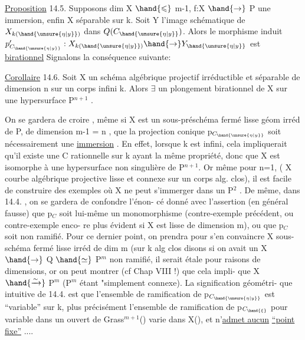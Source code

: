 
\uline{Proposition} 14.5. Supposons dim X $\hand{\leqslant}$ m-1, 
 f:X $\hand{\to}$ P une immersion,  enfin X séparable sur k. Soit Y l'image
schématique de $X_{k(\hand{\unsure{\eta|y}})}$ dans $Q(C_{\hand{\unsure{\eta|y}}})$. Alors le morphisme induit
$p'_{C_{\hand{\unsure{\eta|y}}}} : X_{k(\hand{\unsure{\eta|y}})} \hand{\to} Y_{\hand{\unsure{\eta|y}}}$ est \uline{birationnel}
Signalons la conséquence suivante:

\uline{Corollaire} 14.6. Soit X un schéma algébrique projectif irréductible 
et séparable
de dimension n sur un corps infini k. Alors  $\exists$ un plongement birationnel de X
  sur une hypersurface  P$^{n+1}$ .

On se gardera de croire , même si X est un sous-préschéma fermé
lisse géom irréd de P, de dimension m-1 = n , que la projection conique p$_{C_{\hand{\unsure{\eta|y}}}}$
soit nécessairement une \uline{immersion} . En effet, lorsque k est infini, cela impliquerait
qu'il existe une C rationnelle sur k ayant la même propriété, donc que X
est isomorphe à une hypersurface non singulière de  P$^{n+1}$. Or
même pour n=1, ( X courbe algébrique projective lisse  et connexe sur un corps alg.
clos), il est facile de construire des exemples où X ne peut s'immerger
dans un P$^2$ . De même, dans 14.4. , on se gardera de confondre l'énon-%
cé donné avec l'assertion (en général fausse) que p$_C$ soit lui-même un
monomorphisme (contre-exemple précédent, ou contre-exemple enco-%
re plus évident si X est lisse de dimension m), ou que p$_C$ soit non
ramifié. Pour ce dernier point, on prendra pour s'en convaincre X
sous-schéma fermé lisse  irréd de dim m (sur k alg clos disons
si  on avait un X $\hand{\to}$ Q $\hand{\simeq}$ P$^m$ non ramifié, il serait étale pour
raisons de dimensions, or on peut montrer (cf Chap VIII !) que cela impli-%
que X $\hand{\xrightarrow{\sim}}$ P$^m$ (P$^m$ étant "simplement connexe). \hand{--} La signification géométri-%
que intuitive de 14.4. est que l'ensemble de
ramification de p$_{C_{\hand{\unsure{\eta|y}}}}$ est ``variable'' sur k, plus précisément l'ensemble de
ramification de p$_{C_{\hand{\xi}}}$ pour \hand{\xi} variable dans un ouvert de Grass$^{m+1}$() varie dans X(), et
n'\uline{admet aucun}  \uline{``point fixe''} ....

